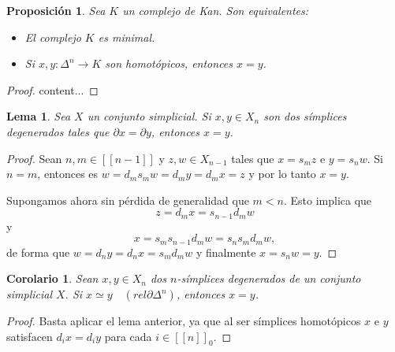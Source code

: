\documentclass[11pt]{report}
\theoremstyle{colored}
\newtheorem{proposition}{Proposición}[section]
\newtheorem{corollary}{Corolario}[section]
\newtheorem{lemma}{Lema}[section]
\newcommand{\nat}[1]{[\![#1]\!]}
\newcommand{\natzero}[1]{\nat{#1}_0}
\renewcommand{\ss}[1]{\Delta^{#1}}
\begin{document}
\begin{proposition} Sea $K$ un complejo de Kan. Son equivalentes:
\begin{itemize}
\item[(i)] El complejo $K$ es minimal.
\item[(ii)] Si $x,y : \ss{n} \to K$ son homotópicos, entonces $x = y$.
\end{itemize}
\end{proposition}
\begin{proof}
content...
\end{proof}

\begin{lemma} Sea $X$ un conjunto simplicial. Si $x,y \in X_n$ son dos símplices degenerados tales que $\partial x = \partial y$, entonces $x = y$.
\end{lemma}
\begin{proof} Sean $n,m \in \nat{n-1}$ y $z,w \in X_{n-1}$ tales que $x = s_mz$ e $y = s_nw$. Si $n = m$, entonces es $w = d_ms_mw= d_my= d_mx = z$ y por lo tanto $x = y$. 

Supongamos ahora sin pérdida de generalidad que $m < n$. Esto implica que
\[
z = d_mx = s_{n-1}d_mw
\]
y
\[
x = s_ms_{n-1}d_mw = s_ns_md_mw,
\]
de forma que $w = d_ny = d_nx = s_md_mw$ y finalmente $x = s_nw = y$.
\end{proof}

\begin{corollary} Sean $x,y \in X_n$ dos $n$-símplices degenerados de un conjunto simplicial $X$. Si $x \simeq y \quad (rel \partial \ss{n})$, entonces $x = y$.
\end{corollary}
\begin{proof} Basta aplicar el lema anterior, ya que al ser símplices homotópicos $x$ e $y$ satisfacen $d_ix = d_iy$ para cada $i \in \natzero{n}$.
\end{proof}
\end{document}
